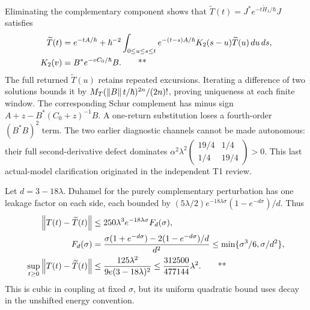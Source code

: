 Eliminating the complementary component shows that
$\widetilde T(t)=J^*e^{-t\widetilde H_\lambda/\hbar}J$ satisfies
\begin{align}
 \widetilde T(t)&=e^{-tA/\hbar}+\hbar^{-2}
 \int_{0\le u\le s\le t}e^{-(t-s)A/\hbar}
 K_2(s-u)\widetilde T(u)\,du\,ds,\notag\\
 K_2(v)&=B^*e^{-vC_0/\hbar}B. \qquad\text{**}
 \label{recent:memory-return}
\end{align}
The full returned $\widetilde T(u)$ retains repeated excursions.  Iterating a
difference of two solutions bounds it by
$M_T(\left\lVert B\right\rVert t/\hbar)^{2n}/(2n)!$, proving uniqueness at each finite window.
The corresponding Schur complement has minus sign
$A+z-B^*(C_0+z)^{-1}B$.  A one-return substitution loses a fourth-order
$(B^*B)^2$ term.  The two earlier diagnostic channels cannot be made autonomous:
their full second-derivative defect dominates
$\alpha^2\lambda^2\left(\begin{smallmatrix}19/4&1/4\\1/4&19/4\end{smallmatrix}\right)>0$.
This last actual-model clarification originated in the independent T1 review.

Let $d=3-18\lambda$.  Duhamel for the purely complementary perturbation has
one leakage factor on each side, each bounded by
$(5\lambda/2)e^{-18\lambda\sigma}(1-e^{-d\sigma})/d$.  Thus
\begin{align}
 \left\lVert T(t)-\widetilde T(t)\right\rVert
 &\le250\lambda^3e^{-18\lambda\sigma}F_d(\sigma),\notag\\
 F_d(\sigma)&=\frac{\sigma(1+e^{-d\sigma})-2(1-e^{-d\sigma})/d}{d^2}
 \le\min\{\sigma^3/6,\sigma/d^2\},\notag\\
 \sup_{t\ge0}\left\lVert T(t)-\widetilde T(t)\right\rVert
 &\le\frac{125\lambda^2}{9e(3-18\lambda)^2}
 \le\frac{312500}{477144}\lambda^2.\qquad\text{**}
 \label{recent:t-unshifted}
\end{align}
This is cubic in coupling at fixed $\sigma$, but its uniform quadratic bound
uses decay in the unshifted energy convention.


